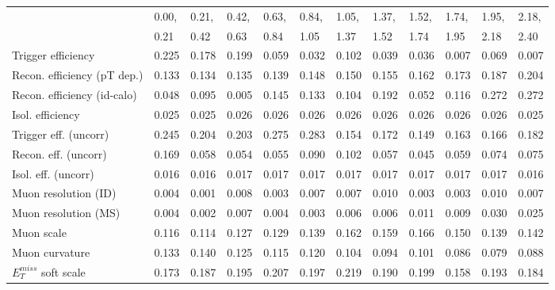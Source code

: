 {
\begin{table}
  \begin{center}
\tiny
\begin{tabular}{l|p{0.6cm}p{0.6cm}p{0.6cm}p{0.6cm}p{0.6cm}p{0.6cm}p{0.6cm}p{0.6cm}p{0.6cm}p{0.6cm}p{0.6cm}}
\hline
   & 0.00, & 0.21, & 0.42, & 0.63, & 0.84, & 1.05, & 1.37, & 1.52, & 1.74, & 1.95, & 2.18,  \\ 
   & 0.21 & 0.42 & 0.63 & 0.84 & 1.05 & 1.37 & 1.52 & 1.74 & 1.95 & 2.18 & 2.40  \\ 
\hline
Trigger efficiency                       & 0.225 & 0.178 & 0.199 & 0.059 & 0.032 & 0.102 & 0.039 & 0.036 & 0.007 & 0.069 & 0.007 \\
Recon. efficiency (pT dep.)              & 0.133 & 0.134 & 0.135 & 0.139 & 0.148 & 0.150 & 0.155 & 0.162 & 0.173 & 0.187 & 0.204 \\
Recon. efficiency (id-calo)              & 0.048 & 0.095 & 0.005 & 0.145 & 0.133 & 0.104 & 0.192 & 0.052 & 0.116 & 0.272 & 0.272 \\
Isol. efficiency                         & 0.025 & 0.025 & 0.026 & 0.026 & 0.026 & 0.026 & 0.026 & 0.026 & 0.026 & 0.026 & 0.025 \\
Trigger eff. (uncorr)                    & 0.245 & 0.204 & 0.203 & 0.275 & 0.283 & 0.154 & 0.172 & 0.149 & 0.163 & 0.166 & 0.182 \\
Recon. eff. (uncorr)                     & 0.169 & 0.058 & 0.054 & 0.055 & 0.090 & 0.102 & 0.057 & 0.045 & 0.059 & 0.074 & 0.075 \\
Isol. eff. (uncorr)                      & 0.016 & 0.016 & 0.017 & 0.017 & 0.017 & 0.017 & 0.017 & 0.017 & 0.017 & 0.017 & 0.016 \\
Muon resolution (ID)                     & 0.004 & 0.001 & 0.008 & 0.003 & 0.007 & 0.007 & 0.010 & 0.003 & 0.003 & 0.010 & 0.007 \\
Muon resolution (MS)                     & 0.004 & 0.002 & 0.007 & 0.004 & 0.003 & 0.006 & 0.006 & 0.011 & 0.009 & 0.030 & 0.025 \\
Muon scale                               & 0.116 & 0.114 & 0.127 & 0.129 & 0.139 & 0.162 & 0.159 & 0.166 & 0.150 & 0.139 & 0.142 \\
Muon curvature                           & 0.133 & 0.140 & 0.125 & 0.115 & 0.120 & 0.104 & 0.094 & 0.101 & 0.086 & 0.079 & 0.088 \\
$E_{T}^{miss}$ soft scale                  & 0.173 & 0.187 & 0.195 & 0.207 & 0.197 & 0.219 & 0.190 & 0.199 & 0.158 & 0.193 & 0.184 \\

\end{tabular}
\end{center}
\end{table}}
